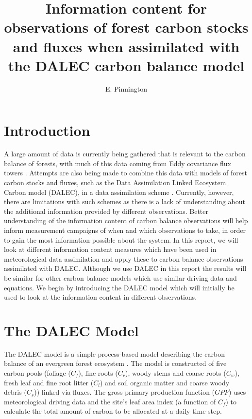 \documentclass[11pt]{article}
\title{Information content for observations of forest carbon stocks and fluxes when assimilated with the DALEC carbon balance model}
\author{\normalsize{E. Pinnington}}
\begin{document}
\maketitle

\section{Introduction}%

A large amount of data is currently being gathered that is relevant to the carbon balance of forests, with much of this data coming from Eddy covariance flux towers \cite{baldocchi2008turner, baldocchi2001fluxnet, running1999global, valentini2000respiration}. Attempts are also being made to combine this data with models of forest carbon stocks and fluxes, such as the Data Assimilation Linked Ecosystem Carbon model (DALEC), in a data assimilation scheme \cite{williams2005improved, fox2009reflex}. Currently, however, there are limitations with such schemes as there is a lack of understanding about the additional information provided by different observations. Better understanding of the information content of carbon balance observations will help inform measurement campaigns of when and which observations to take, in order to gain the most information possible about the system. In this report, we will look at different information content measures which have been used in meteorological data assimilation \cite{rodgers2000inverse, fisher2003estimation, sandu2012practical} and apply these to carbon balance observations assimilated with DALEC. Although we use DALEC in this report the results will be similar for other carbon balance models which use similar driving data and equations. We begin by introducing the DALEC model which will initially be used to look at the information content in different observations.

\section{The DALEC Model}%

The DALEC model is a simple process-based model describing the carbon balance of an evergreen forest ecosystem \cite{williams2005improved}. The model is constructed of five carbon pools (foliage ($C_f$), fine roots ($C_r$), woody stems and coarse roots ($C_w$), fresh leaf and fine root litter ($C_l$) and soil organic matter and coarse woody debris ($C_s$)) linked via fluxes. The gross primary production function ($GPP$) uses meteorological driving data and the site's leaf area index (a function of $C_f$) to calculate the total amount of carbon to be allocated at a daily time step.   
\end{document}
